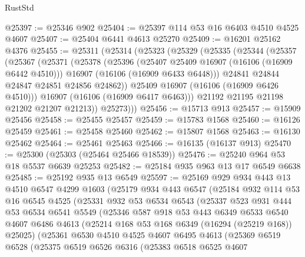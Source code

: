 \begin{lexlean}{RustStd}
\begin{coremodule}
@25397 := @25346 @902
@25404 := @25397 @114 @53 @16 @6403 @4510 @4525 @4607
@25407 := @25404 @6441 @4613 @25270
@25409 := @16201 @25162 @4376
@25455 := @25311
    (@25314
      (@25323
        (@25329
          (@25335
            (@25344
              (@25357
                (@25367
                  (@25371
                    (@25378
                      (@25396
                        (@25407 @25409 @16907 (@16106 (@16909 @6442 @4510)))
                        @16907
                        (@16106 (@16909 @6433 @6448)))
                      @24841
                      @24844
                      @24847
                      @24851
                      @24856
                      @24862))
                  @25409
                  @16907
                  (@16106 (@16909 @6426 @4510)))
                @16907
                (@16106 (@16909 @6417 @6463)))
              @21192
              @21195
              @21198
              @21202
              @21207
              @21213))
          @25273)))
@25456 := @15713 @913
@25457 := @15909 @25456
@25458 := @25455 @25457
@25459 := @15783 @1568
@25460 := @16126 @25459
@25461 := @25458 @25460
@25462 := @15807 @1568
@25463 := @16130 @25462
@25464 := @25461 @25463
@25466 := @16135 (@16137 @913)
@25470 := @25300 (@25303 (@25464 @25466 @18539))
@25476 := @25240 @964 @53 @18 @5537 @6639 @25253
@25482 := @25184 @935 @963 @13 @17 @6549 @6638
@25485 := @25192 @935 @13 @6549
@25597 := @25169
    @929
    @934
    @443
    @13
    @4510
    @6547
    @4299
    @1603
    (@25179
      @934
      @443
      @6547
      (@25184
        @932
        @114
        @53
        @16
        @6545
        @4525
        (@25331
          @932
          @53
          @6534
          @6543
          (@25337
            @523
            @931
            @444
            @53
            @6534
            @6541
            @5549
            (@25346
              @587
              @918
              @53
              @443
              @6349
              @6533
              @6540
              @4607
              @6486
              @4613
              (@25214 @168 @53 @168 @6349 (@16294 (@25219 @168)) @25025)
              (@25361
                @6530
                @4510
                @4525
                @4607
                @6495
                @4613
                (@25369
                  @6519
                  @6528
                  (@25375
                    @6519
                    @6526
                    @6316
                    (@25383
                      @6518
                      @6525
                      @4607

\end{coremodule}
\end{lexlean}
